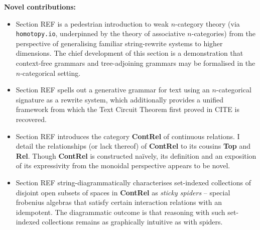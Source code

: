 



\maketitle%

\tableofcontents{}

\newpage
\vfill
\begin{myboxB}
\centering
\textbf{Novel contributions:}
\begin{itemize}

\item Section \bR REF \e is a pedestrian introduction to weak $n$-category theory (via \texttt{homotopy.io}, underpinned by the theory of associative $n$-categories) from the perspective of generalising familiar string-rewrite systems to higher dimensions. The chief development of this section is a demonstration that context-free grammars and tree-adjoining grammars may be formalised in the $n$-categorical setting.

\item Section \bR REF \e spells out a generative grammar for text using an $n$-categorical signature as a rewrite system, which additionally provides a unified framework from which the Text Circuit Theorem first proved in \bR CITE \e is recovered.

\item Section \bR REF \e introduces the category \textbf{ContRel} of continuous relations. I detail the relationships (or lack thereof) of \textbf{ContRel} to its cousins \textbf{Top} and \textbf{Rel}. Though \textbf{ContRel} is constructed na\"{i}vely, its definition and an exposition of its expressivity from the monoidal perspective appears to be novel.

\item Section \bR REF \e string-diagrammatically characterises set-indexed collections of disjoint open subsets of spaces in \textbf{ContRel} as \emph{sticky spiders} -- special frobenius algebras that satisfy certain interaction relations with an idempotent. The diagrammatic outcome is that reasoning with such set-indexed collections remains as graphically intuitive as with spiders.


\end{itemize}
\end{myboxB}
